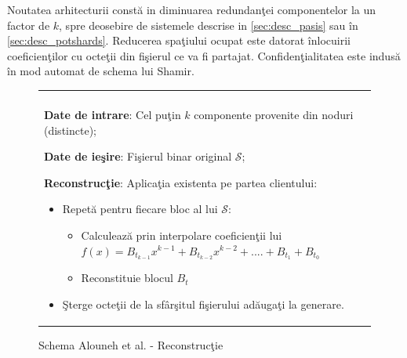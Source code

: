 \documentclass{llncs}
\begin{document}
Noutatea arhitecturii const\u{a} in diminuarea redundan\c{t}ei componentelor la un factor de $k$, spre deosebire de sistemele descrise in \ref{sec:desc_pasis} sau \^{i}n \ref{sec:desc_potshards}. Reducerea spa\c{t}iului ocupat este datorat \^{i}nlocuirii coeficien\c{t}ilor cu octe\c{t}ii din fi\c{s}ierul ce va fi partajat. Confiden\c{t}ialitatea este indus\u{a} \^{i}n mod automat de schema lui Shamir.

\begin{figure}[h!]

\begin{tabular}{|p{\textwidth}|}
\hline

\\
\hspace{.1in}
\textbf{Date de intrare}: Cel pu\c{t}in $k$ componente provenite din noduri (distincte);
\medskip

\hspace{.1in}
\textbf{Date de ie\c{s}ire}: Fi\c{s}ierul binar original $\mathcal{S}$;
\medskip

\hspace{.1in}
\textbf{Reconstruc\c{t}ie}: Aplica\c{t}ia existenta pe partea clientului: 
	\begin{itemize}
		\item Repet\u{a} pentru fiecare bloc al lui $\mathcal{S}$:
		\begin{itemize}
			\item Calculeaz\u{a} prin interpolare coeficien\c{t}ii lui $f(x)=B_{t_{k - 1}}x ^ {k-1} + B_{t_{k - 2}}x ^ {k - 2} + .... + B_{t_1} + B_{t_0}$
			\item Reconstituie blocul $B_t$
		\end{itemize}
		\item \c{S}terge octe\c{t}ii de la sf\^{a}r\c{s}itul fi\c{s}ierului ad\u{a}uga\c{t}i la generare. 
	\end{itemize}

\\
\hline
\end{tabular}
\caption{Schema Alouneh et al. - Reconstruc\c{t}ie \cite{AAMK:2013}}
\label{fig:alouneh_reconstruction}
\end{figure}

\end{document}
